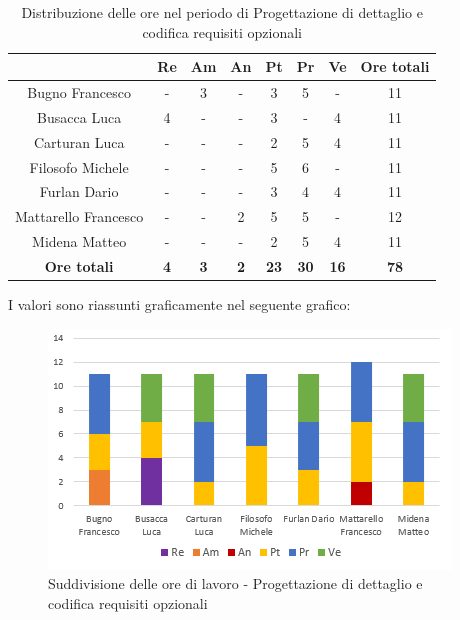    \begin{table}[H]
       \centering
       \renewcommand{\arraystretch}{1.8}
       \begin{tabular}{c|c|c|c|c|c|c|c}
         \rowcolor[HTML]{125E28} 
         \multicolumn{1}{c}{\color[HTML]{FFFFFF}\textbf{ Nominativo }}
         & \multicolumn{1}{c}{\color[HTML]{FFFFFF}\textbf{ Re }}
         & \multicolumn{1}{c}{\color[HTML]{FFFFFF}\textbf{ Am}}
         & \multicolumn{1}{c}{\color[HTML]{FFFFFF}\textbf{ An }}
         & \multicolumn{1}{c}{\color[HTML]{FFFFFF}\textbf{ Pt }}
         & \multicolumn{1}{c}{\color[HTML]{FFFFFF}\textbf{ Pr }}
         & \multicolumn{1}{c}{\color[HTML]{FFFFFF}\textbf{ Ve }}
         & \multicolumn{1}{c}{\color[HTML]{FFFFFF}\textbf{ Ore totali }}\\
         \hline
         Bugno Francesco        & - & 3 & - & 3 & 5 & - & 11\\
         Busacca Luca           & 4 & - & - & 3 & - & 4 & 11\\
         Carturan Luca          & - & - & - & 2 & 5 & 4 & 11\\
         Filosofo Michele       & - & - & - & 5 & 6 & - & 11\\
         Furlan Dario           & - & - & - & 3 & 4 & 4 & 11\\
         Mattarello Francesco   & - & - & 2 & 5 & 5 & - & 12\\
         Midena Matteo          & - & - & - & 2 & 5 & 4 & 11\\
         \textbf{Ore totali} & \textbf{4} & \textbf{3} & \textbf{2} & \textbf{23} & \textbf{30} & \textbf{16} & \textbf{78}
       \end{tabular}
       \caption{Distribuzione delle ore nel periodo di Progettazione di dettaglio e codifica requisiti opzionali}
     \end{table}
   
   I valori sono riassunti graficamente nel seguente grafico:
   
   \begin{figure}[H]
       \centering
        \includegraphics[scale=1.2]{immagini/ore_lavoro_reqOpzionali.png}
        \caption{Suddivisione delle ore di lavoro - Progettazione di dettaglio e codifica requisiti opzionali}
      \end{figure}
   
